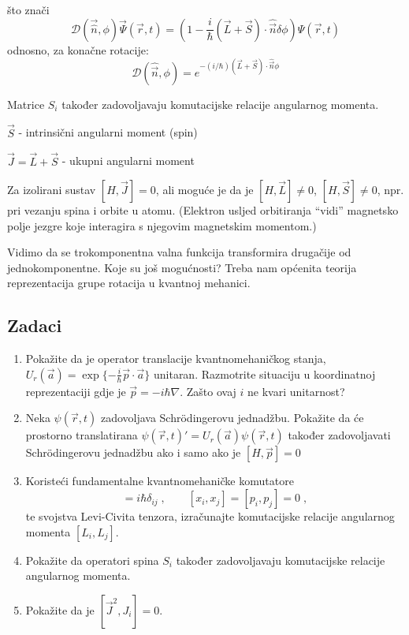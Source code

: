 što znači
\begin{equation*}
\mathcal{D}(\vec{\hat{n}},\phi)\vec{\Psi}(\vec{r}, t)=
 \left(1-\frac{i}{\hbar}(\vec{L}+\vec{S})\cdot\hat{\vec{n}}\delta\phi \right)
  \Psi(\vec{r}, t)
\end{equation*}
odnosno, za konačne rotacije:
\begin{equation}
\mathcal{D}(\hat{\vec{n}}, \phi)=
 e^{-(i/\hbar)(\vec{L}+\vec{S})\cdot\hat{\vec{n}}\phi}
\end{equation}

Matrice $S_i$ također zadovoljavaju komutacijske relacije angularnog
momenta.


$\vec{S}$ - intrinsični angularni moment (spin)

$\vec{J}=\vec{L}+\vec{S}$  - ukupni angularni moment

Za izolirani sustav $[H, \vec{J}] = 0$, ali moguće je da je
$[H, \vec{L}] \neq 0$, $[H, \vec{S}] \neq 0$, npr. pri vezanju spina
i orbite u atomu. (Elektron usljed orbitiranja ``vidi'' magnetsko polje
jezgre koje interagira s njegovim magnetskim momentom.)

Vidimo da se trokomponentna valna funkcija transformira drugačije
od jednokomponentne. Koje su još mogućnosti? Treba nam općenita teorija
reprezentacija grupe rotacija u kvantnoj mehanici.

\subsection*{Zadaci}

\begin{enumerate}[{4}.1]

\item Pokažite da je operator translacije kvantnomehaničkog stanja,
 $U_{r}(\vec{a}) = \exp \{-\frac{i}{\hbar} \vec{p}\cdot \vec{a} \}$
unitaran. Razmotrite situaciju u koordinatnoj reprezentaciji gdje
je $\vec{p} = -i \hbar \nabla$. Zašto ovaj $i$ ne kvari unitarnost?

\item Neka $\psi(\vec{r}, t)$ zadovoljava Schr\"{o}dingerovu jednadžbu.
Pokažite da će prostorno translatirana $\psi(\vec{r}, t)' = 
U_{r}(\vec{a}) \psi(\vec{r}, t)$ također zadovoljavati Schr\"{o}dingerovu
jednadžbu ako i samo ako je $[H, \vec{p}] = 0$

\item Koristeći fundamentalne kvantnomehaničke komutatore
\begin{displaymath}
 [x_i, p_j] = i\hbar \delta_{ij}\;, \qquad
 [x_i, x_j] = [p_i, p_j] = 0 \;,
\end{displaymath}
te svojstva Levi-Civita tenzora, izračunajte komutacijske
relacije angularnog momenta $[L_i, L_j]$.

\item Pokažite da operatori spina $S_i$ također zadovoljavaju komutacijske
relacije angularnog momenta.

\item Pokažite da je $[\vec{J}^2, J_i] = 0$.
\end{enumerate}
